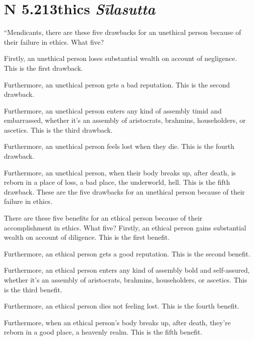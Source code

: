 \documentclass[12pt,openany]{book}%
\newcommand*{\suttatitleacronym}[1]{\smaller[2]{#1}\vspace*{.3em}}
\newcommand*{\suttatitletranslation}[1]{\linebreak{#1}}
\newcommand*{\suttatitleroot}[1]{\linebreak\smaller[2]\itshape{#1}}
\newcommand*{\tocacronym}[1]{\hspace*{-3.3em}{#1}\quad}
\newcommand*{\toctranslation}[1]{#1}
\newcommand*{\tocroot}[1]{(\textit{#1})}
\begin{document}
%
\section*{{\suttatitleacronym AN 5.213}{\suttatitletranslation Ethics }{\suttatitleroot Sīlasutta}}
\addcontentsline{toc}{section}{\tocacronym{AN 5.213} \toctranslation{Ethics } \tocroot{Sīlasutta}}

“Mendicants, there are these five drawbacks for an unethical person because of their failure in ethics. What five? 

Firstly, an unethical person loses substantial wealth on account of negligence. This is the first drawback. 

Furthermore, an unethical person gets a bad reputation. This is the second drawback. 

Furthermore, an unethical person enters any kind of assembly timid and embarrassed, whether it’s an assembly of aristocrats, brahmins, householders, or ascetics. This is the third drawback. 

Furthermore, an unethical person feels lost when they die. This is the fourth drawback. 

Furthermore, an unethical person, when their body breaks up, after death, is reborn in a place of loss, a bad place, the underworld, hell. This is the fifth drawback. These are the five drawbacks for an unethical person because of their failure in ethics. 

There are these five benefits for an ethical person because of their accomplishment in ethics. What five? Firstly, an ethical person gains substantial wealth on account of diligence. This is the first benefit. 

Furthermore, an ethical person gets a good reputation. This is the second benefit. 

Furthermore, an ethical person enters any kind of assembly bold and self-assured, whether it’s an assembly of aristocrats, brahmins, householders, or ascetics. This is the third benefit. 

Furthermore, an ethical person dies not feeling lost. This is the fourth benefit. 

Furthermore, when an ethical person’s body breaks up, after death, they’re reborn in a good place, a heavenly realm. This is the fifth benefit. 
\end{document}
